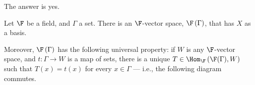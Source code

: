 \documentclass[10pt]{mypackage}
\begin{document}
The answer is yes.
\begin{theorem}
  Let $\F$ be a field, and $\Gamma$ a set. There is an $\F$-vector space, $\F\left(\Gamma\right)$, that has $X$ as a basis.\newline

  Moreover, $\F\left(\Gamma\right)$ has the following universal property: if $W$ is any $\F$-vector space, and $t: \Gamma\rightarrow W$ is a map of sets, there is a unique $T\in \Hom_{\F}\left(\F(\Gamma),W\right)$ such that $T(x) = t(x)$ for every $x\in \Gamma$ --- i.e., the following diagram commutes.
  \begin{center}
  \end{center}
\end{theorem}
\end{document}
